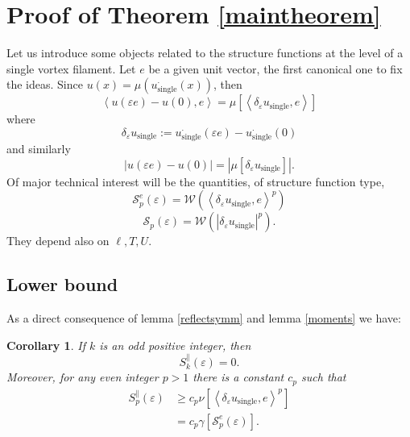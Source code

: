 \documentclass[a4paper,12pt]{article}
\newtheorem{corollary}{Corollary}
\begin{document}
\section{Proof of Theorem \ref{maintheorem}}

Let us introduce some objects related to the structure functions at the level
of a single vortex filament. Let $e$ be a given unit vector, the first
canonical one to fix the ideas. Since $u(x)=\mu\left(  u_{\text{single}%
}^{\cdot}\left(  x\right)  \right)  $, then
\[
\left\langle u(\varepsilon e)-u(0),e\right\rangle =\mu\left[  \left\langle
\delta_{\varepsilon}u_{\text{single}},e\right\rangle \right]
\]
where
\[
\delta_{\varepsilon}u_{\text{single}}:=u_{\text{single}}^{\cdot}\left(
\varepsilon e\right)  -u_{\text{single}}^{\cdot}\left(  0\right)
\]
and similarly
\[
\left|  u(\varepsilon e)-u(0)\right|  =\left|  \mu\left[  \delta_{\varepsilon
}u_{\text{single}}\right]  \right|  .
\]
Of major technical interest will be the quantities, of structure function
type,
\[
\mathcal{S}_{p}^{e}(\varepsilon)=\mathcal{W}(\left\langle \delta_{\varepsilon
}u_{\text{single}},e\right\rangle ^{p})
\]%
\[
\mathcal{S}_{p}(\varepsilon)=\mathcal{W}(\left|  \delta_{\varepsilon
}u_{\text{single}}\right|  ^{p}).
\]
They depend also on $\ell,T,U$.

\subsection{Lower bound}

As a direct consequence of lemma \ref{reflectsymm} and lemma \ref{moments} we have:

\begin{corollary}
If $k$ is an odd positive integer, then
\[
S_{k}^{\parallel}(\varepsilon)=0.
\]
Moreover, for any even integer $p>1$ there is a constant $c_{p}$ such that
\begin{align*}
S_{p}^{\parallel}(\varepsilon)  &  \geq c_{p}\nu\left[  \left\langle
\delta_{\varepsilon}u_{\text{single}},e\right\rangle ^{p}\right] \\
&  =c_{p}\gamma\left[  \mathcal{S}_{p}^{e}(\varepsilon)\right]  .
\end{align*}
\end{corollary}
\end{document}
